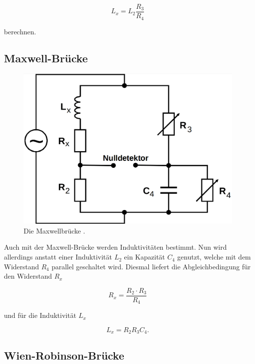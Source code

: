 \begin{equation}
    L_x = L_2 \frac{R_3}{R_4}
    \label{eqn:indl}
\end{equation}

berechnen.

\subsection{Maxwell-Brücke}

\begin{figure}
    \centering
    \includegraphics[scale=0.25]{content/Maxwellbruecke.png}
    \caption{Die Maxwellbrücke \cite[S. 222]{anleitung}.}
    \label{fig:maxwell}
\end{figure}

Auch mit der Maxwell-Brücke werden Induktivitäten bestimmt. 
Nun wird allerdings anstatt einer Induktivität $L_2$ ein Kapazität $C_4$ genutzt,
welche mit dem Widerstand $R_4$ parallel geschaltet wird. 
Diesmal liefert die Abgleichbedingung für den Widerstand $R_x$

\begin{equation}
    R_x = \frac{R_2 \cdot R_3}{R_4}
    \label{eqn:mw_r}
\end{equation}

und für die Induktivität $L_x$

\begin{equation}
    L_x = R_2 R_3 C_4 .
    \label{eqn:mw_l}
\end{equation}

\subsection{Wien-Robinson-Brücke}

